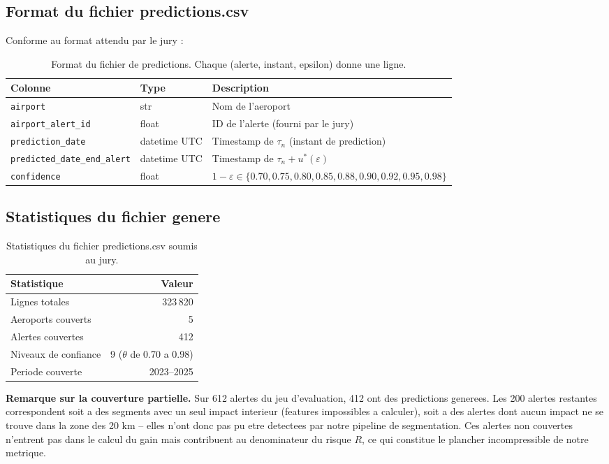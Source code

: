 \documentclass[a4paper,11pt]{article}
\begin{document}
\subsection{Format du fichier predictions.csv}

Conforme au format attendu par le jury :

\begin{table}[H]
\centering
\begin{tabular}{lll}
\toprule
Colonne & Type & Description \\
\midrule
\texttt{airport} & str & Nom de l'aeroport \\
\texttt{airport\_alert\_id} & float & ID de l'alerte (fourni par le jury) \\
\texttt{prediction\_date} & datetime UTC & Timestamp de $\tau_n$ (instant de prediction) \\
\texttt{predicted\_date\_end\_alert} & datetime UTC & Timestamp de $\tau_n + u^*(\varepsilon)$ \\
\texttt{confidence} & float & $1 - \varepsilon \in \{0.70, 0.75, 0.80, 0.85, 0.88, 0.90, 0.92, 0.95, 0.98\}$ \\
\bottomrule
\end{tabular}
\caption{Format du fichier de predictions. Chaque (alerte, instant, epsilon) donne une ligne.}
\end{table}

\subsection{Statistiques du fichier genere}

\begin{table}[H]
\centering
\begin{tabular}{lr}
\toprule
Statistique & Valeur \\
\midrule
Lignes totales & 323\,820 \\
Aeroports couverts & 5 \\
Alertes couvertes & 412 \\
Niveaux de confiance & 9 ($\theta$ de 0.70 a 0.98) \\
Periode couverte & 2023--2025 \\
\bottomrule
\end{tabular}
\caption{Statistiques du fichier predictions.csv soumis au jury.}
\end{table}

\textbf{Remarque sur la couverture partielle.} Sur 612 alertes du jeu
d'evaluation, 412 ont des predictions generees. Les 200 alertes restantes
correspondent soit a des segments avec un seul impact interieur (features
impossibles a calculer), soit a des alertes dont aucun impact ne se trouve
dans la zone des 20 km -- elles n'ont donc pas pu etre detectees par notre
pipeline de segmentation. Ces alertes non couvertes n'entrent pas dans le
calcul du gain mais contribuent au denominateur du risque $R$, ce qui
constitue le plancher incompressible de notre metrique.
\end{document}
